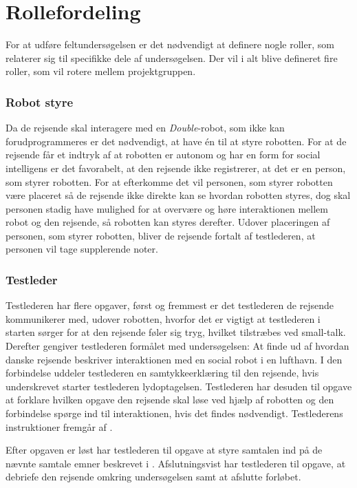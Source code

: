 \section{Rollefordeling}
\label{ParametreRollefordeling}
%
For at udføre feltundersøgelsen er det nødvendigt at definere nogle roller, som relaterer sig til specifikke dele af undersøgelsen. Der vil i alt blive defineret fire roller, som vil rotere mellem projektgruppen.
%
\subsubsection*{Robot styre}
Da de rejsende skal interagere med en \textit{Double}-robot, som ikke kan forudprogrammeres er det nødvendigt, at have én til at styre robotten. For at de rejsende får et indtryk af at robotten er autonom og har en form for social intelligens er det favorabelt, at den rejsende ikke registrerer, at det er en person, som styrer robotten. For at efterkomme det vil personen, som styrer robotten være placeret så de rejsende ikke direkte kan se hvordan robotten styres, dog skal personen stadig have mulighed for at overvære og høre interaktionen mellem robot og den rejsende, så robotten kan styres derefter. Udover placeringen af personen, som styrer robotten, bliver de rejsende fortalt af testlederen, at personen vil tage supplerende noter. 

\subsubsection*{Testleder}
Testlederen har flere opgaver, først og fremmest er det testlederen de rejsende kommunikerer med, udover robotten, hvorfor det er vigtigt at testlederen i starten sørger for at den rejsende føler sig tryg, hvilket tilstræbes ved small-talk. Derefter gengiver testlederen formålet med undersøgelsen: At finde ud af hvordan danske rejsende beskriver interaktionen med en social robot i en lufthavn. I den forbindelse uddeler testlederen en samtykkeerklæring til den rejsende, hvis underskrevet starter testlederen lydoptagelsen. Testlederen har desuden til opgave at forklare hvilken opgave den rejsende skal løse ved hjælp af robotten og den forbindelse spørge ind til interaktionen, hvis det findes nødvendigt. Testlederens instruktioner fremgår af .

Efter opgaven er løst har testlederen til opgave at styre samtalen ind på de nævnte samtale emner beskrevet i . Afslutningsvist har testlederen til opgave, at debriefe den rejsende omkring undersøgelsen samt at afslutte forløbet.
   

